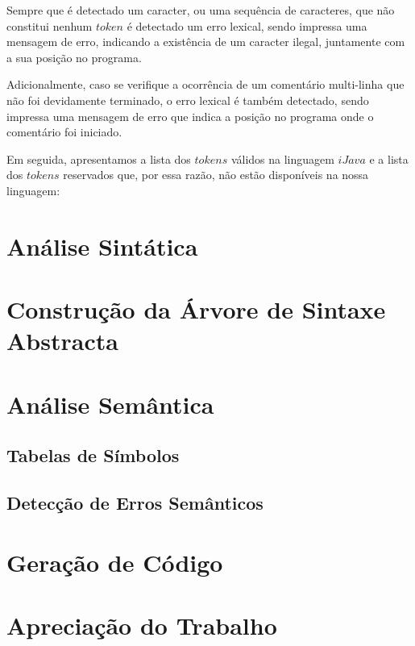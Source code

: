 \documentclass[11pt,a4paper]{article}
\begin{document}
Sempre que é detectado um caracter, ou uma sequência de caracteres, que não constitui nenhum $token$ é detectado um erro lexical, sendo impressa uma mensagem de erro, indicando a existência de um caracter ilegal, juntamente com a sua posição no programa.

Adicionalmente, caso se verifique a ocorrência de um comentário multi-linha que não foi devidamente terminado, o erro lexical é também detectado, sendo impressa uma mensagem de erro que indica a posição no programa onde o comentário foi iniciado.

Em seguida, apresentamos a lista dos $tokens$ válidos na linguagem $iJava$ e a lista dos $tokens$ reservados que, por essa razão, não estão disponíveis na nossa linguagem:


\pagebreak

\section{Análise Sintática}

\pagebreak

\section{Construção da Árvore de Sintaxe Abstracta}

\pagebreak

\section{Análise Semântica}

	\subsection{Tabelas de Símbolos}
	
\pagebreak
	
	\subsection{Detecção de Erros Semânticos}
	
\pagebreak
	
\section{Geração de Código}

\pagebreak

\section{Apreciação do Trabalho}
\end{document}

